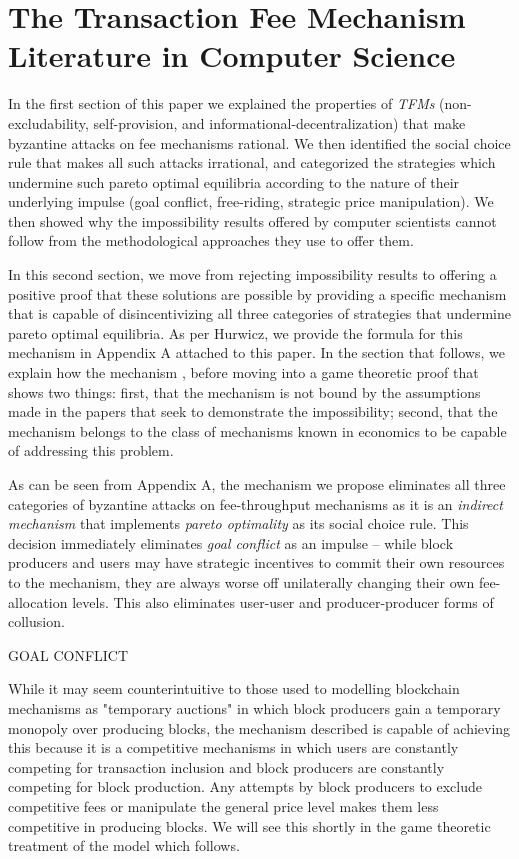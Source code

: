 \documentclass[sigconf,anonymous]{aamas}
\begin{document}
\section{The Transaction Fee Mechanism Literature in Computer Science\label{sec::section1p2}}

In the first section of this paper we explained the properties of \textit{TFMs} (non-excludability, self-provision, and informational-decentralization) that make byzantine attacks on fee mechanisms rational. We then identified the social choice rule that makes all such attacks irrational, and categorized the strategies which undermine such pareto optimal equilibria according to the nature of their underlying impulse (goal conflict, free-riding, strategic price manipulation). We then showed why the impossibility results offered by computer scientists cannot follow from the methodological approaches they use to offer them.

In this second section, we move from rejecting impossibility results to offering a positive proof that these solutions are possible by providing a specific mechanism that is capable of disincentivizing all three categories of strategies that undermine pareto optimal equilibria. As per Hurwicz, we provide the formula for this mechanism in Appendix A attached to this paper. In the section that follows, we explain how the mechanism , before moving into a game theoretic proof that shows two things: first, that the mechanism is not bound by the assumptions made in the papers that seek to demonstrate the impossibility; second, that the mechanism belongs to the class of mechanisms known in economics to be capable of addressing this problem.

As can be seen from Appendix A, the mechanism we propose eliminates all three categories of byzantine attacks on fee-throughput mechanisms as it is an \textit{indirect mechanism} that implements \textit{pareto optimality} as its social choice rule. This decision immediately eliminates \textit{goal conflict} as an impulse -- while block producers and users may have strategic incentives to commit their own resources to the mechanism, they are always worse off unilaterally changing their own fee-allocation levels. This also eliminates user-user and producer-producer forms of collusion.

GOAL CONFLICT

While it may seem counterintuitive to those used to modelling blockchain mechanisms as "temporary auctions" in which block producers gain a temporary monopoly over producing blocks, the mechanism described is capable of achieving this because it is a competitive mechanisms in which users are constantly competing for transaction inclusion and block producers are constantly competing for block production. Any attempts by block producers to exclude competitive fees or manipulate the general price level makes them less competitive in producing blocks. We will see this shortly in the game theoretic treatment of the model which follows.
\end{document}
